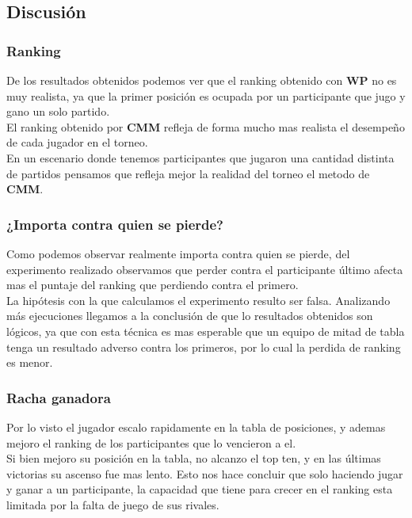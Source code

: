 \subsection{Discusión}


\subsubsection{Ranking}

De los resultados obtenidos podemos ver que el ranking obtenido con \textbf{WP} no es muy realista, ya que la primer posición es ocupada por un participante que jugo y gano un solo partido. \\

El ranking obtenido por \textbf{CMM} refleja de forma mucho mas realista el desempeño de cada jugador en el torneo. \\

En un escenario donde tenemos participantes que jugaron una cantidad distinta de partidos pensamos que refleja mejor la realidad del torneo el metodo de \textbf{CMM}. \\


\subsubsection{¿Importa contra quien se pierde?}

Como podemos observar realmente importa contra quien se pierde, del experimento realizado observamos que perder contra el participante último afecta mas el puntaje del ranking que perdiendo 
contra el primero. \\

La hipótesis con la que calculamos el experimento resulto ser falsa. Analizando más ejecuciones llegamos a la conclusión de que lo resultados obtenidos son lógicos, ya que con esta técnica 
es mas esperable que un equipo de mitad de tabla tenga un resultado adverso contra los primeros, por lo cual la perdida de ranking es menor. \\


\subsubsection{Racha ganadora}

Por lo visto el jugador escalo rapidamente en la tabla de posiciones, y ademas mejoro el ranking de los participantes que lo vencieron a el.\\

Si bien mejoro su posición en la tabla, no alcanzo el top ten, y en las últimas victorias su ascenso fue mas lento. Esto nos hace concluir que solo haciendo jugar y ganar 
a un participante, la capacidad que tiene para crecer en el ranking esta limitada por la falta de juego de sus rivales.



